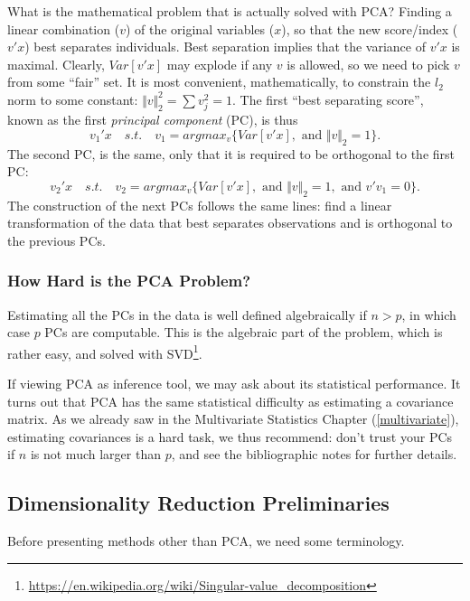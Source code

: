 \documentclass[]{book}
\renewcommand{\href}[2]{#2\footnote{\url{#1}}}
\theoremstyle{definition}
\theoremstyle{definition}
\theoremstyle{definition}
\theoremstyle{remark}
\begin{document}
What is the mathematical problem that is actually solved with PCA?
Finding a linear combination (\(v\)) of the original variables (\(x\)), so that the new score/index (\(v'x\)) best separates individuals.
Best separation implies that the variance of \(v'x\) is maximal.
Clearly, \(Var[v'x]\) may explode if any \(v\) is allowed, so we need to pick \(v\) from some ``fair'' set.
It is most convenient, mathematically, to constrain the \(l_2\) norm to some constant: \(\Vert v \Vert^2_2=\sum v_j^2=1\).
The first ``best separating score'', known as the first \emph{principal component} (PC), is thus
\[v_1'x \quad s.t. \quad v_1=argmax_{v}\{Var[v'x], \text{ and } \Vert v \Vert_2=1  \} .\]
The second PC, is the same, only that it is required to be orthogonal to the first PC:
\[v_2'x \quad s.t. \quad v_2=argmax_{v}\{Var[v'x], \text{ and } \Vert v \Vert_2=1, \text{ and } v'v_1=0 \} .\]
The construction of the next PCs follows the same lines: find a linear transformation of the data that best separates observations and is orthogonal to the previous PCs.

\hypertarget{how-hard-is-the-pca-problem}{%
\subsubsection{How Hard is the PCA Problem?}\label{how-hard-is-the-pca-problem}}

Estimating all the PCs in the data is well defined algebraically if \(n>p\), in which case \(p\) PCs are computable.
This is the algebraic part of the problem, which is rather easy, and solved with \href{https://en.wikipedia.org/wiki/Singular-value_decomposition}{SVD}.

If viewing PCA as inference tool, we may ask about its statistical performance.
It turns out that PCA has the same statistical difficulty as estimating a covariance matrix.
As we already saw in the Multivariate Statistics Chapter (\ref{multivariate}), estimating covariances is a hard task, we thus recommend: don't trust your PCs if \(n\) is not much larger than \(p\), and see the bibliographic notes for further details.

\hypertarget{dimensionality-reduction-preliminaries}{%
\subsection{Dimensionality Reduction Preliminaries}\label{dimensionality-reduction-preliminaries}}

Before presenting methods other than PCA, we need some terminology.
\end{document}
